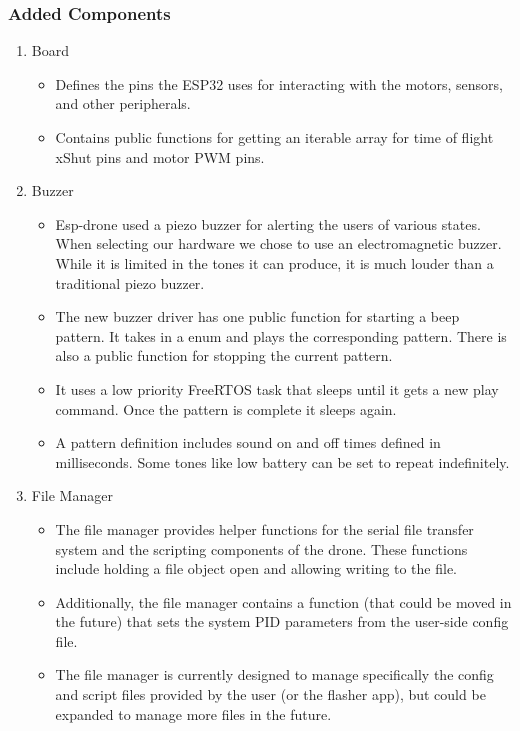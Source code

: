 \documentclass[12pt, titlepage]{article}
\begin{document}
\subsubsection{Added Components}
\begin{enumerate}
  \item Board
    \begin{itemize}
      \item Defines the pins the ESP32 uses for interacting with the motors, sensors, and other peripherals.
      \item Contains public functions for getting an iterable array for time of flight xShut pins and motor PWM pins.
    \end{itemize}
  \item Buzzer
    \begin{itemize}
      \item Esp-drone used a piezo buzzer for alerting the users of various states. When selecting our hardware we chose to use an electromagnetic buzzer. While it is limited in the tones it can produce, it is much louder than a traditional piezo buzzer. 
      \item The new buzzer driver has one public function for starting a beep pattern. It takes in a enum and plays the corresponding pattern. There is also a public function for stopping the current pattern.
      \item It uses a low priority FreeRTOS task that sleeps until it gets a new play command. Once the pattern is complete it sleeps again. 
      \item A pattern definition includes sound on and off times defined in milliseconds. Some tones like low battery can be set to repeat indefinitely. 
    \end{itemize}
  \item File Manager
    \begin{itemize}
      \item The file manager provides helper functions for the serial file transfer system and the scripting components of the drone. These functions include holding a file object open and allowing writing to the file.
      \item Additionally, the file manager contains a function (that could be moved in the future) that sets the system PID parameters from the user-side config file.
      \item The file manager is currently designed to manage specifically the config and script files provided by the user (or the flasher app), but could be expanded to manage more files in the future.

\end{itemize}
\end{enumerate}
\end{document}
